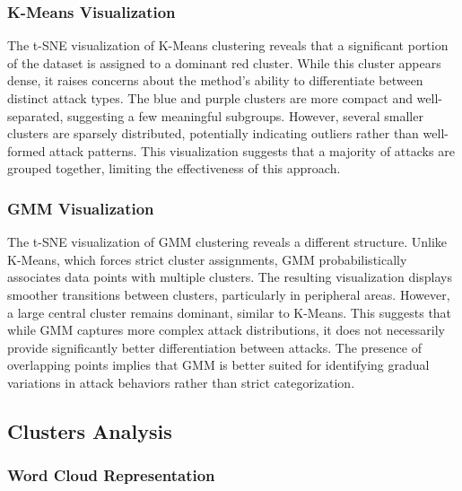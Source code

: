         \subsubsection{K-Means Visualization \\}

        The t-SNE visualization of K-Means clustering reveals that a significant portion of the dataset is assigned to a dominant red cluster. While this cluster appears dense, it raises concerns about the method’s ability to differentiate between distinct attack types. The blue and purple clusters are more compact and well-separated, suggesting a few meaningful subgroups. However, several smaller clusters are sparsely distributed, potentially indicating outliers rather than well-formed attack patterns. This visualization suggests that a majority of attacks are grouped together, limiting the effectiveness of this approach.

        \subsubsection{GMM Visualization \\}
        
        The t-SNE visualization of GMM clustering reveals a different structure. Unlike K-Means, which forces strict cluster assignments, GMM probabilistically associates data points with multiple clusters. The resulting visualization displays smoother transitions between clusters, particularly in peripheral areas. However, a large central cluster remains dominant, similar to K-Means. This suggests that while GMM captures more complex attack distributions, it does not necessarily provide significantly better differentiation between attacks. The presence of overlapping points implies that GMM is better suited for identifying gradual variations in attack behaviors rather than strict categorization.

    \subsection{Clusters Analysis}

        \subsubsection{Word Cloud Representation \\}

